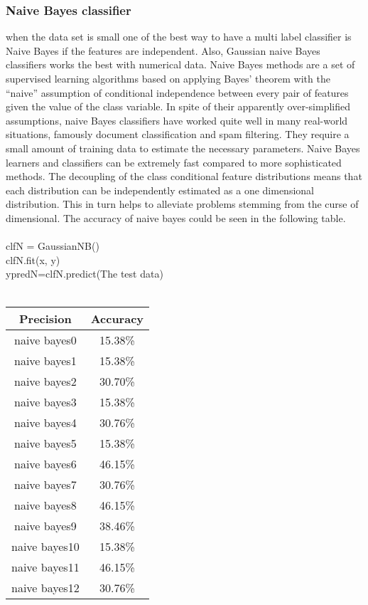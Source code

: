 \documentclass{article}
\begin{document}
{\subsubsection{Naive Bayes classifier}
\par{when the data set is small one of the best way to have a multi label classifier is Naive Bayes if the features are independent. Also, Gaussian naive Bayes classifiers works the best with numerical data. Naive Bayes methods are a set of supervised learning algorithms based on applying Bayes’ theorem with the “naive” assumption of conditional independence between every pair of features given the value of the class variable. In spite of their apparently over-simplified assumptions, naive Bayes classifiers have worked quite well in many real-world situations, famously document classification and spam filtering. They require a small amount of training data to estimate the necessary parameters. Naive Bayes learners and classifiers can be extremely fast compared to more sophisticated methods. The decoupling of the class conditional feature distributions means that each distribution can be independently estimated as a one dimensional distribution. This in turn helps to alleviate problems stemming from the curse of dimensional. The accuracy of naive bayes could be seen in the following table.}
\\\\
clfN = GaussianNB()
\\
clfN.fit(x, y)
\\
ypredN=clfN.predict(The test data)
\\\\

\begin{center}
 \begin{tabular}{||c c||} 
 \hline
 Precision & Accuracy \\ [2ex] 
 \hline\hline
naive bayes0  & 15.38\%\\  [2ex] 
 \hline
naive bayes1  & 15.38\%\\  [2ex] 
 \hline
naive bayes2  & 30.70\%\\  [2ex] 
 \hline
naive bayes3  & 15.38\%\\  [2ex] 
 \hline
naive bayes4  & 30.76\%\\  [2ex] 
 \hline
naive bayes5  & 15.38\%\\  [2ex] 
 \hline
naive bayes6  & 46.15\%\\  [2ex] 
 \hline
naive bayes7  & 30.76\%\\  [2ex] 
 \hline
naive bayes8  & 46.15\%\\  [2ex] 
 \hline
naive bayes9  & 38.46\%\\  [2ex] 
 \hline
naive bayes10  & 15.38\%\\  [2ex] 
 \hline
naive bayes11  & 46.15\%\\  [2ex] 
 \hline
naive bayes12  & 30.76\%\\  [2ex] 
 \hline


\end{tabular}
\end{center}}
\end{document}
